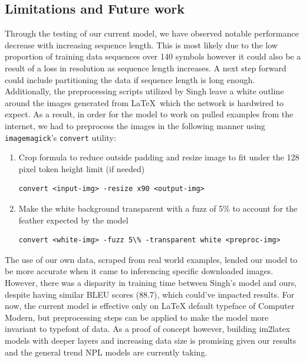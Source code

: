 \documentclass[12pt]{article}
\begin{document}
\subsection{Limitations and Future work}

Through the testing of our current model, we have observed notable performance
decrease with increasing sequence length. This is most likely due to the low
proportion of training data sequences over 140 symbols however it could also be
a result of a loss in resolution as sequence length increases. A next step
forward could include partitioning the data if sequence length is long enough.
Additionally, the preprocessing scripts utilized by Singh
\parencite{singh2018teaching} leave a white outline around the images generated
from \LaTeX\ which the network is hardwired to expect. As a result, in order for
the model to work on pulled examples from the internet, we had to preprocess the
images in the following manner using \texttt{imagemagick}'s \texttt{convert}
utility:
\begin{enumerate}
  \item Crop formula to reduce outside padding and resize image to fit under the
  128 pixel token height limit (if needed)
  \vspace{1em}
  \begin{lstlisting}[basicstyle=\ttfamily]
    convert <input-img> -resize x90 <output-img>
  \end{lstlisting}
  \item Make the white background transparent with a fuzz of 5\% to account for
  the feather expected by the model
  \vspace{1em}
  \begin{lstlisting}[basicstyle=\ttfamily]
    convert <white-img> -fuzz 5\% -transparent white <preproc-img>
  \end{lstlisting} 
\end{enumerate}

The use of our own data, scraped from real world examples, lended our model to
be more accurate when it came to inferencing specific downloaded images.
However, there was a disparity in training time between Singh's model and ours,
despite having similar BLEU scores (88.7), which could've impacted results. For now,
the current model is effective only on \LaTeX{} default typeface of Computer
Modern, but preprocessing steps can be applied to make the model more invariant
to typefont of data. As a proof of concept however, building im2latex models
with deeper layers and increasing data size is promising given our results and
the general trend NPL models are currently taking.
\end{document}
